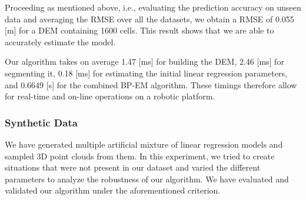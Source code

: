 Proceeding as mentioned above, i.e., evaluating the prediction accuracy on
unseen data and averaging the RMSE over all the datasets, we obtain a RMSE of
0.055 [m] for a DEM containing 1600 cells. This result shows that we are able
to accurately estimate the model.

Our algorithm takes on average 1.47 [ms] for building the DEM, 2.46 [ms] for
segmenting it, 0.18 [ms] for estimating the initial linear regression
parameters, and 0.6649 [s] for the combined BP-EM algorithm. These timings
therefore allow for real-time and on-line operations on a robotic platform.

\subsubsection{Synthetic Data}

We have generated multiple artificial mixture of linear regression models and
sampled 3D point clouds from them. In this experiment, we tried to create
situations that were not present in our dataset and varied the different
parameters to analyze the robustness of our algorithm. We have evaluated and
validated our algorithm under the aforementioned criterion.
